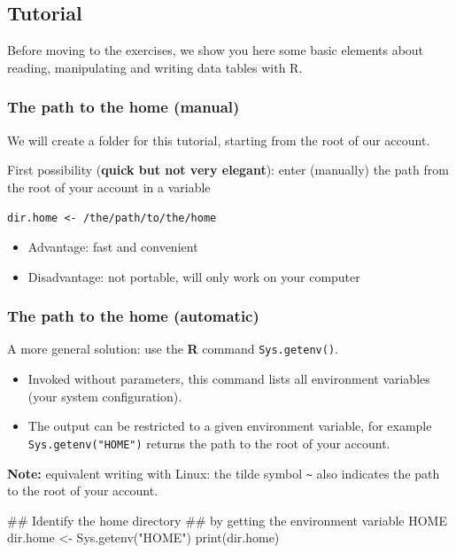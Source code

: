 \documentclass[]{article}
\newenvironment{Shaded}{\begin{snugshade}}{\end{snugshade}}
\newcommand{\KeywordTok}[1]{\textcolor[rgb]{0.94,0.87,0.69}{#1}}
\newcommand{\StringTok}[1]{\textcolor[rgb]{0.80,0.58,0.58}{#1}}
\newcommand{\NormalTok}[1]{\textcolor[rgb]{0.80,0.80,0.80}{#1}}
\providecommand{\tightlist}{%
  \setlength{\itemsep}{0pt}\setlength{\parskip}{0pt}}
\begin{document}
\subsection{Tutorial}\label{tutorial}

Before moving to the exercises, we show you here some basic elements
about reading, manipulating and writing data tables with R.

\subsubsection{The path to the home
(manual)}\label{the-path-to-the-home-manual}

We will create a folder for this tutorial, starting from the root of our
account.

First possibility (\textbf{quick but not very elegant}): enter
(manually) the path from the root of your account in a variable

\texttt{dir.home\ \textless{}-\ /the/path/to/the/home}

\begin{itemize}
\tightlist
\item
  Advantage: fast and convenient
\item
  Disadvantage: not portable, will only work on your computer
\end{itemize}

\subsubsection{The path to the home
(automatic)}\label{the-path-to-the-home-automatic}

A more general solution: use the \textbf{R} command
\texttt{Sys.getenv()}.

\begin{itemize}
\tightlist
\item
  Invoked without parameters, this command lists all environment
  variables (your system configuration).
\item
  The output can be restricted to a given environment variable, for
  example \texttt{Sys.getenv("HOME")} returns the path to the root of
  your account.
\end{itemize}

\textbf{Note:} equivalent writing with Linux: the tilde symbol
\texttt{\textasciitilde{}} also indicates the path to the root of your
account.

\begin{Shaded}
\begin{Highlighting}[]
\NormalTok{## Identify the home directory }
\NormalTok{## by getting the environment variable HOME }
\NormalTok{dir.home <-}\StringTok{ }\KeywordTok{Sys.getenv}\NormalTok{(}\StringTok{"HOME"}\NormalTok{)}
\KeywordTok{print}\NormalTok{(dir.home)}
\end{Highlighting}
\end{Shaded}
\end{document}
